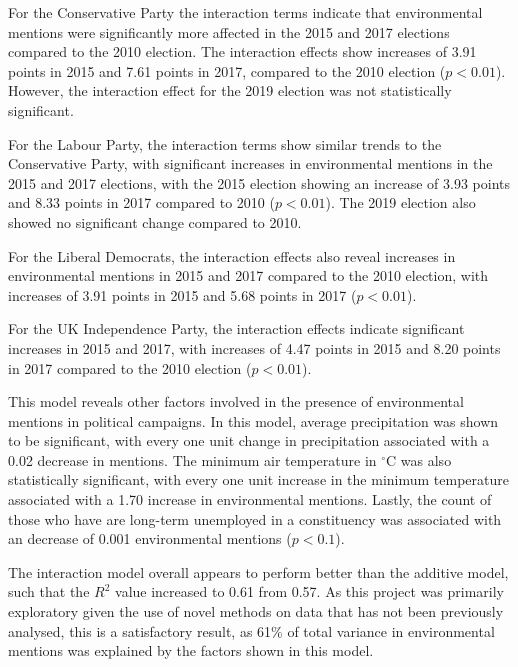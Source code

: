 \documentclass[12pt,letterpaper]{article}
\renewcommand{\headrulewidth}{0pt} %
\begin{document}
For the Conservative Party the interaction terms indicate that environmental mentions were significantly more affected in the 2015 and 2017 elections compared to the 2010 election. The interaction effects show increases of 3.91 points in 2015 and 7.61 points in 2017, compared to the 2010 election ($p<0.01$). However, the interaction effect for the 2019 election was not statistically significant.

For the Labour Party, the interaction terms show similar trends to the Conservative Party, with significant increases in environmental mentions in the 2015 and 2017 elections, with the 2015 election showing an increase of 3.93 points and 8.33 points in 2017 compared to 2010 ($p<0.01$). The 2019 election also showed no significant change compared to 2010.

For the Liberal Democrats, the interaction effects also reveal increases in environmental mentions in 2015 and 2017 compared to the 2010 election, with increases of 3.91 points in 2015 and 5.68 points in 2017 ($p<0.01$). 

For the UK Independence Party, the interaction effects indicate significant increases in 2015 and 2017, with increases of 4.47 points in 2015 and 8.20 points in 2017 compared to the 2010 election ($p<0.01$). 

This model reveals other factors involved in the presence of environmental mentions in political campaigns. In this model, average precipitation was shown to be significant, with every one unit change in precipitation associated with a 0.02 decrease in mentions. The minimum air temperature in $^\circ$C was also statistically significant, with every one unit increase in the minimum temperature associated with a 1.70 increase in environmental mentions. Lastly, the count of those who have are long-term unemployed in a constituency was associated with an decrease of 0.001 environmental mentions ($p<0.1$). 

The interaction model overall appears to perform better than the additive model, such that the $R^2$ value increased to 0.61 from 0.57. As this project was primarily exploratory given the use of novel methods on data that has not been previously analysed, this is a satisfactory result, as 61\% of total variance in environmental mentions was explained by the factors shown in this model.



\newpage

\fancypagestyle{special}{%
	\fancyhf{} %
	\renewcommand{\headrulewidth}{0pt} %
	\renewcommand{\footrulewidth}{0pt} %
	\fancyfoot[R]{\thepage} %
}
\end{document}
